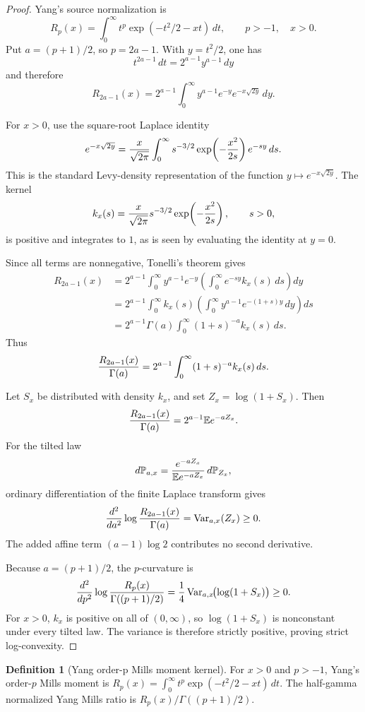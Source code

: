 \documentclass[11pt]{article}
\numberwithin{equation}{section}
\theoremstyle{definition}
\newtheorem{definition}{Definition}[section]
\theoremstyle{remark}
\newcommand{\1}{\mathbf 1}
\begin{document}
\begin{proof}
Yang's source normalization is
\[
R_p(x)=\int_0^\infty t^p\exp(-t^2/2-xt)\,dt,\qquad p>-1,\quad x>0.
\]
Put \(a=(p+1)/2\), so \(p=2a-1\). With \(y=t^2/2\), one has
\[
t^{2a-1}\,dt=2^{a-1}y^{a-1}\,dy
\]
and therefore
\[
R_{2a-1}(x)
=2^{a-1}\int_0^\infty y^{a-1}e^{-y}e^{-x\sqrt{2y}}\,dy.
\]

For \(x>0\), use the square-root Laplace identity
\[
e^{-x\sqrt{2y}}
={x\over\sqrt{2\pi}}\int_0^\infty
s^{-3/2}\exp\!\left(-{x^2\over 2s}\right)e^{-sy}\,ds.
\]
This is the standard Levy-density representation of the function \(y\mapsto e^{-x\sqrt{2y}}\). The kernel
\[
k_x(s)={x\over\sqrt{2\pi}}s^{-3/2}\exp\!\left(-{x^2\over 2s}\right),\qquad s>0,
\]
is positive and integrates to \(1\), as is seen by evaluating the identity at \(y=0\).

Since all terms are nonnegative, Tonelli's theorem gives
\[
\begin{aligned}
R_{2a-1}(x)
&=2^{a-1}\int_0^\infty y^{a-1}e^{-y}
\left(\int_0^\infty e^{-sy}k_x(s)\,ds\right)dy \\
&=2^{a-1}\int_0^\infty k_x(s)
\left(\int_0^\infty y^{a-1}e^{-(1+s)y}\,dy\right)ds \\
&=2^{a-1}\Gamma(a)\int_0^\infty (1+s)^{-a}k_x(s)\,ds .
\end{aligned}
\]
Thus
\[
{R_{2a-1}(x)\over \Gamma(a)}
=2^{a-1}\int_0^\infty (1+s)^{-a}k_x(s)\,ds.
\]

Let \(S_x\) be distributed with density \(k_x\), and set \(Z_x=\log(1+S_x)\). Then
\[
{R_{2a-1}(x)\over \Gamma(a)}
=2^{a-1}\mathbb E e^{-aZ_x}.
\]
For the tilted law
\[
d\mathbb P_{a,x}
={e^{-aZ_x}\over \mathbb E e^{-aZ_x}}\,d\mathbb P_{Z_x},
\]
ordinary differentiation of the finite Laplace transform gives
\[
{d^2\over da^2}\log {R_{2a-1}(x)\over \Gamma(a)}
=\operatorname{Var}_{a,x}(Z_x)\ge 0.
\]
The added affine term \((a-1)\log 2\) contributes no second derivative.

Because \(a=(p+1)/2\), the \(p\)-curvature is
\[
{d^2\over dp^2}\log {R_p(x)\over \Gamma((p+1)/2)}
={1\over4}\operatorname{Var}_{a,x}\!\bigl(\log(1+S_x)\bigr)\ge 0.
\]
For \(x>0\), \(k_x\) is positive on all of \((0,\infty)\), so \(\log(1+S_x)\) is nonconstant under every tilted law. The variance is therefore strictly positive, proving strict log-convexity.
\end{proof}

\begin{definition}[Yang order-p Mills moment kernel]
\label{res:yang-millsordermomentkernel}
For \(x>0\) and \(p>-1\), Yang's order-\(p\) Mills moment is \(R_p(x)=\int_0^\infty t^p\exp(-t^2/2-xt)\,dt\). The half-gamma normalized Yang Mills ratio is \(R_p(x)/\Gamma((p+1)/2)\).
\end{definition}
\end{document}
